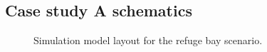 \begin{appendices}
\chapter{Case study A schematics}\label{ASchematics}
\newpage
\begin{figure}[h!]
	\centering
	\caption{Simulation model layout for the refuge bay scenario.}
	\label{fig: KUS Baseline model}
\end{figure}


\end{appendices}
